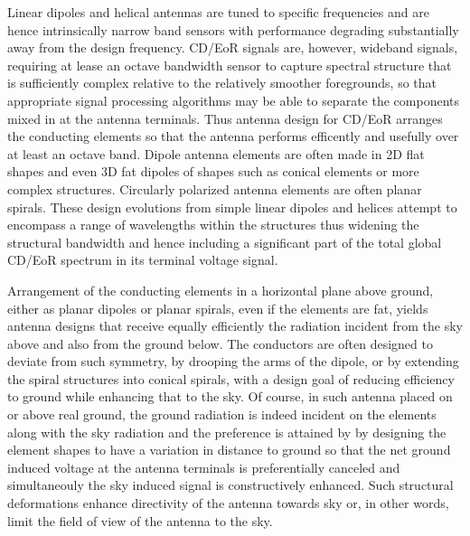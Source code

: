   Linear dipoles and helical antennas are tuned to specific frequencies and are hence intrinsically narrow band sensors with performance degrading substantially away from the design frequency. CD/EoR signals are, however, wideband signals, requiring at lease an octave bandwidth sensor to capture spectral structure that is sufficiently complex relative to the relatively smoother foregrounds, so that appropriate signal processing algorithms may be able to separate the components mixed in at the antenna terminals.  Thus antenna design for CD/EoR arranges the conducting elements so that the antenna performs efficently and usefully over at least an octave band.  Dipole antenna elements are often made in 2D flat shapes and even 3D fat dipoles of shapes such as conical elements or more complex structures. Circularly polarized antenna elements are often planar spirals.  These design evolutions from simple linear dipoles and helices attempt to encompass a range of wavelengths within the structures thus widening the structural bandwidth and hence including a significant part of the total global CD/EoR spectrum in its terminal voltage signal.
  
  Arrangement of the conducting elements in a horizontal plane above ground, either as planar dipoles or planar spirals, even if the elements are fat, yields antenna designs that receive equally efficiently the radiation incident from the sky above and also from the ground below. The conductors are often designed to deviate from such symmetry, by drooping the arms of the dipole, or by extending the spiral structures into conical spirals, with a design goal of reducing efficiency to ground while enhancing that to the sky. Of course, in such antenna placed on or above real ground, the ground radiation is indeed incident on the elements along with the sky radiation and the preference is attained by by designing the element shapes to have a variation in distance to ground so that the net ground induced voltage at the antenna terminals is preferentially canceled and simultaneouly the sky induced signal is constructively enhanced. Such structural deformations enhance directivity of the antenna towards sky or, in other words, limit the field of view of the antenna to the sky.
  
